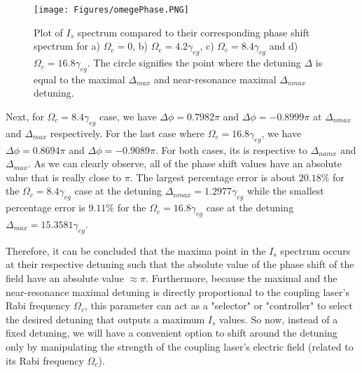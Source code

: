 \begin{figure}
    \centering
    \texttt{[image: Figures/omegePhase.PNG]}
    \caption[Plot of $I_{s}$ Spectrum Compared With The Phase Shift]{Plot of $I_{s}$ spectrum compared to their corresponding phase shift spectrum for a) $\Omega_{c} = 0$, b) $\Omega_{c} = 4.2\gamma_{eg}$, c) $\Omega_{c} = 8.4\gamma_{eg}$ and d) $\Omega_{c} = 16.8\gamma_{eg}$. The circle signifies the point where the detuning $\Delta$ is equal to the maximal $\Delta_{max}$ and near-resonance maximal $\Delta_{nmax}$ detuning.}
    \label{fig: omegaPhase}
\end{figure}

Next,  for $\Omega_{c} = 8.4\gamma_{eg}$ case, we have $\Delta\phi = 0.7982\pi$ and $\Delta\phi = -0.8999\pi$ at $\Delta_{nmax}$ and $\Delta_{max}$ respectively. For the last case where $\Omega_{c} = 16.8\gamma_{eg}$, we have $\Delta\phi = 0.8694\pi$ and $\Delta\phi = -0.9089\pi$. For both cases, its is respective to $\Delta_{namx}$ and $\Delta_{max}$. As we can clearly observe, all of the phase shift values have an absolute value that is really close to $\pi$. The largest percentage error is about $20.18\%$ for the $\Omega_{c} = 8.4\gamma_{eg}$ case at the detuning $\Delta_{nmax} = 1.2977\gamma_{eg}$ while the smallest percentage error is $9.11\%$ for the $\Omega_{c} = 16.8\gamma_{eg}$ case at the detuning $\Delta_{max} = 15.3581\gamma_{eg}$.

Therefore, it can be concluded that the maxima point in the $I_{s}$ spectrum occurs at their respective detuning such that the absolute value of the phase shift of the field have an absolute value $\approx \pi$. Furthermore, because the maximal and the near-resonance maximal detuning is directly proportional to the coupling laser's Rabi frequency $\Omega_{c}$, this parameter can act as a "selector" or "controller" to select the desired detuning that outputs a maximum $I_{s}$ values. So now, instead of a fixed detuning, we will have a convenient option to shift around the detuning only by manipulating the strength of the coupling laser's electric field (related to its Rabi frequency $\Omega_{c}$).
